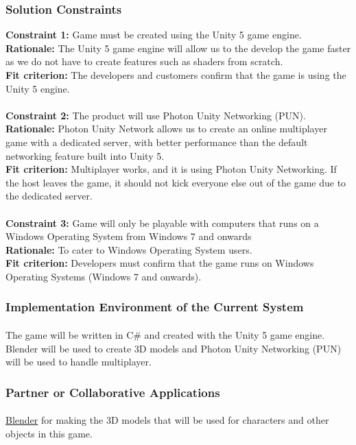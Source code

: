 \documentclass[12pt, titlepage]{article}
\begin{document}
\subsubsection{Solution Constraints}
\textbf{Constraint 1:} Game must be created using the Unity 5 game engine.\\
\textbf{Rationale:} The Unity 5 game engine will allow us to the develop the game faster as we do not have to create features such as shaders from scratch.\\
\textbf{Fit criterion:} The developers and customers confirm that the game is using the Unity 5 engine.
\\\\
\textbf{Constraint 2:} The product will use Photon Unity Networking (PUN).\\
\textbf{Rationale:} Photon Unity Network allows us to create an online multiplayer game with a dedicated server, with better performance than the default networking feature built into Unity 5.\\
\textbf{Fit criterion:} Multiplayer works, and it is using Photon Unity Networking. If the host leaves the game, it should not kick everyone else out of the game due to the dedicated server.
\\\\
\textbf{Constraint 3:} Game will only be playable with computers that runs on a Windows Operating System from Windows 7 and onwards\\ 
\textbf{Rationale:} To cater to Windows Operating System users.\\
\textbf{Fit criterion:} Developers must confirm that the game runs on Windows Operating Systems (Windows 7 and onwards).

\subsubsection{Implementation Environment of the Current System}
\paragraph{}The game will be written in C\# and created with the Unity 5 game engine. Blender will be used to create 3D models and Photon Unity Networking (PUN) will be used to handle multiplayer. 
\subsubsection{Partner or Collaborative Applications}
\paragraph{}\href{https://www.blender.org/}{Blender} for making the 3D models that will be used for characters and other objects in this game.
\end{document}
